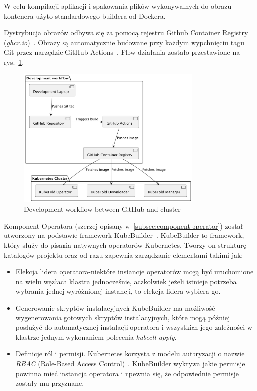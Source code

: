 W celu kompilacji aplikacji i spakowania plików wykonywalnych do obrazu kontenera użyto standardowego buildera od Dockera.

Dystrybucja obrazów odbywa się za pomocą rejestru Github Container Registry (\textit{ghcr.io})~\cite{ghcr}.
Obrazy są automatycznie budowane przy każdym wypchnięciu tagu Git przez narzędzie GitHub Actions~\cite{github_actions}.
Flow działania zostało przestawione na rys.~\ref{fig:docker-images-flow}.

\begin{figure}[htbp]
    \centering
    \includegraphics[width=0.8\textwidth]{images/images}
    \caption{Development workflow between GitHub and cluster}
    \label{fig:docker-images-flow}
\end{figure}

Komponent Operatora (szerzej opisany w~\ref{subsec:component-operator}) został utworzony na podstawie framework KubeBuilder~\cite{kubebuilder}.
KubeBuilder to framework, który służy do pisania natywnych operatorów Kubernetes.
Tworzy on strukturę katalogów projektu oraz od razu zapewnia zarządzanie elementami takimi jak:
\begin{itemize}
    \item Elekcja lidera operatora-niektóre instancje operatorów mogą być uruchomione na wielu węzłach klastra jednocześnie, aczkolwiek jeżeli istnieje potrzeba wybrania jednej wyróżnionej instancji, to elekcja lidera wybiera go.
    \item Generowanie skryptów instalacyjnych-KubeBuilder ma możliwość wygenerowania gotowych skryptów instalacyjnych, które mogą później posłużyć do automatycznej instalacji operatora i wszystkich jego zależności w klastrze jednym wykonaniem polecenia \textit{kubectl apply}.
    \item Definicje ról i permisji.
    Kubernetes korzysta z modelu autoryzacji o nazwie \textit{RBAC} (Role-Based Access Control)~\cite{k8s_rbac}.
    KubeBuilder wykrywa jakie permisje powinna mieć instancja operatora i upewnia się, że odpowiednie permisje zostały mu przyznane.
\end{itemize}


